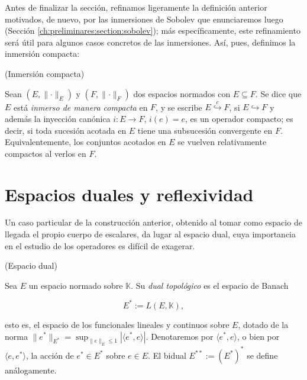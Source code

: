 Antes de finalizar la sección, refinamos ligeramente la definición anterior motivados, de nuevo, por las inmersiones de Sobolev que enunciaremos luego (Sección \ref{ch:preliminares:section:sobolev}); más específicamente, este refinamiento será útil para algunos casos concretos de las inmersiones. Así, pues, definimos la inmersión compacta:\\

\begin{Definicion}{(Inmersión compacta)}
\label{ch:preliminares:def:inmersionCompacta}

Sean $(E, \lVert \cdot \rVert_E)$ y $(F, \lVert \cdot \rVert_F)$ dos espacios
normados con $E \subseteq F$. Se dice que $E$ está \textit{inmerso de manera compacta}
en $F$, y se escribe $E \overset{c}{\hookrightarrow} F$, si $E \hookrightarrow F$ y además la inyección canónica
$i : E \rightarrow F$, $i(e) = e$, es un operador compacto; es decir, si toda sucesión acotada en $E$ tiene una subsucesión convergente en $F$. Equivalentemente, los conjuntos acotados en $E$ se vuelven relativamente compactos al verlos en $F$.
\end{Definicion}

\section{Espacios duales y reflexividad}
\label{ch:preliminares:section:dual}

Un caso particular de la construcción anterior, obtenido al tomar como espacio de
llegada el propio cuerpo de escalares, da lugar al espacio dual, cuya importancia
en el estudio de los operadores es difícil de exagerar.\\

\begin{Definicion}{(Espacio dual)}
\label{ch:preliminares:def:dual}

Sea $E$ un espacio normado sobre $\mathbb{K}$. Su \textit{dual topológico} es el
espacio de Banach

\[E^* := L(E, \mathbb{K}),\]

esto es, el espacio de los funcionales lineales y continuos sobre $E$, dotado de
la norma $\lVert e^* \rVert_{E^*} = \sup_{\lVert e \rVert_E \leq 1} |\langle e^*, e \rangle|$.
Denotaremos por $\langle e^*, e \rangle$, o bien por $\langle e, e^* \rangle$, la
acción de $e^* \in E^*$ sobre $e \in E$. El bidual $E^{**} := (E^*)^*$ se define
análogamente.
\end{Definicion}

